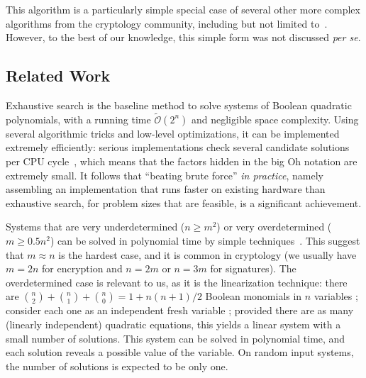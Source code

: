 \documentclass[a4paper,UKenglish,cleveref, autoref]{lipics-v2019}
\newcommand{\bigOsoft}[1]{\ensuremath{\mathcal{\tilde O}\left( #1 \right)} }
\begin{document}
This algorithm is a particularly simple special case of several other more
complex algorithms from the cryptology community, including but not limited
to~\cite{CourtoisKPS00,BettaleFP09,JouxV17}. However, to the best of our
knowledge, this simple form was not discussed \textit{per se}.

\subsection{Related Work}
\label{sec:related}

Exhaustive search is the baseline method to solve systems of Boolean quadratic
polynomials, with a running time $\bigOsoft{2^n}$ and negligible space
complexity. Using several algorithmic tricks and low-level optimizations, it can
be implemented extremely efficiently: serious implementations check several
candidate solutions per CPU cycle~\cite{BouillaguetCCCNSY10}, which means that
the factors hidden in the big Oh notation are extremely small. It follows that
``beating brute force'' \emph{in practice}, namely assembling an implementation
that runs faster on existing hardware than exhaustive search, for problem sizes
that are feasible, is a significant achievement.

Systems that are very underdetermined ($n \geq m^2$) or very overdetermined
($m \geq 0.5 n^2$) can be solved in polynomial time by simple
techniques~\cite{CourtoisGMT02}. This suggest that $m \approx n$ is the hardest
case, and it is common in cryptology (we usually have $m=2n$ for encryption and
$n = 2m$ or $n=3m$ for signatures). The overdetermined case is relevant to us, as
it is the linearization technique: there are
$\binom{n}{2} + \binom{n}{1} + \binom{n}{0} = 1 + n(n+1)/2$ Boolean monomials in
$n$ variables ; consider each one as an independent fresh variable ; provided
there are as many (linearly independent) quadratic equations, this yields a
linear system with a small number of solutions. This system can be solved in
polynomial time, and each solution reveals a possible value of the variable. On
random input systems, the number of solutions is expected to be only one.
\end{document}
